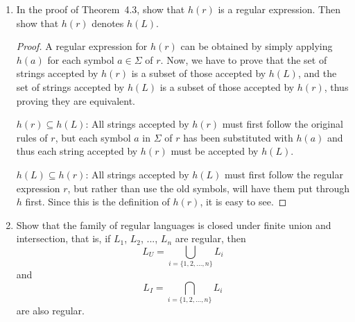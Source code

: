 \documentclass[]{book}
\theoremstyle{definition}
\newenvironment{thm}[1]
  {\renewcommand\theinnercustomtheorem{#1}\innercustomtheorem}
  {\endinnercustomtheorem}
\begin{document}
\begin{enumerate}
\begin{thm}{4.3}
    \begin{proof}
        Let $L$ be a regular language denoted by some regular expression $r$. We find
        $h(r)$ by substituting $h(a)$ for each symbol $a \in \Sigma$ of $r$. It can be shown
        directly by an appeal to the definition of a regular expression that the result is a
        regular expression. It is equally easy to see that the resulting expression denotes
        $h(L)$. All we need to do is to show that for every $w \in L(r)$, the corresponding
        $h(w)$ is in $L(h(r))$ and conversely that for every $v$ in $L(h(r))$ there is a $w$
        in $L$, such that $v = h(w)$. Leaving details as an exercise, we claim that $h(L)$ is
        regular.
    \end{proof}
\end{thm}

\item
    In the proof of Theorem~4.3, show that $h(r)$ is a regular expression. Then show that
    $h(r)$ denotes $h(L)$.

    \begin{proof}
        A regular expression for $h(r)$ can be obtained by simply applying $h(a)$ for
        each symbol $a \in \Sigma$ of $r$. Now, we have to prove that the set of strings
        accepted by $h(r)$ is a subset of those accepted by $h(L)$, and the set of strings
        accepted by $h(L)$ is a subset of those accepted by $h(r)$, thus proving they are
        equivalent.
        
        $h(r) \subseteq h(L)$: All strings accepted by $h(r)$ must first follow the original
        rules of $r$, but each symbol $a$ in $\Sigma$ of $r$ has been substituted with
        $h(a)$ and thus each string accepted by $h(r)$ must be accepted by $h(L)$.
        
        $h(L) \subseteq h(r)$: All strings accepted by $h(L)$ must first follow the regular
        expression $r$, but rather than use the old symbols, will have them put through $h$
        first. Since this is the definition of $h(r)$, it is easy to see.
    \end{proof}
    
\item
    Show that the family of regular languages is closed under finite union and intersection,
    that is, if $L_1$, $L_2$, ..., $L_n$ are regular, then
        $$L_U = \displaystyle\bigcup_{i=\{1, 2, ..., n\}} L_i$$ and
        $$L_I = \displaystyle\bigcap_{i=\{1, 2, ..., n\}} L_i$$ are also regular.
    

\end{enumerate}
\end{document}
